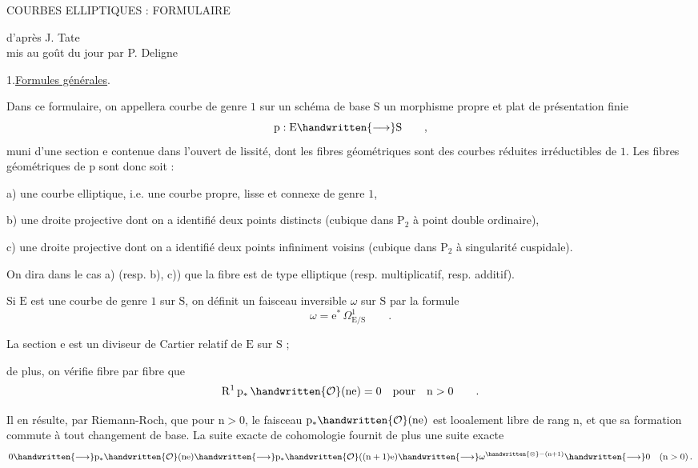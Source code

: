 \begin{center}
COURBES ELLIPTIQUES : FORMULAIRE

d'après J. Tate\\
mis au goût du jour par P. Deligne
\end{center}

1.\qquad \uline{Formules générales}.

Dans ce formulaire, on appellera courbe de genre $1$ sur un schéma de base $\mathrm{S}$ un morphisme propre et plat de présentation finie
\[
\mathrm{p}:\mathrm{E}\handwritten{\longrightarrow}\mathrm{S}\qquad,
\]
muni d'une section $\mathrm{e}$ contenue dans l'ouvert de lissité, dont les fibres géométriques sont des courbes réduites irréductibles de \reversemarginpar{}\normalmarginpar $1$. Les fibres géométriques de $\mathrm{p}$ sont donc soit :

a) une courbe elliptique, i.e. une courbe propre, lisse et connexe de genre $1$,

b) une droite projective dont on a identifié deux points distincts (cubique dans $\mathrm{P}_{2}$ à point double ordinaire),

c) une droite projective dont on a identifié deux points infiniment voisins (cubique dans $\mathrm{P}_{2}$ à singularité cuspidale).

On dira dans le cas a) (resp. b), c)) que la fibre est de type elliptique (resp. multiplicatif, resp. additif).

Si $\mathrm{E}$ est une courbe de genre $1$ sur $\mathrm{S}$, on définit un faisceau inversible $\omega$ sur $\mathrm{S}$ par la formule
\[
\omega=\mathrm{e}^{*}\,\Omega^{1}_{\mathrm{E}/\mathrm{S}}\qquad.
\]

La section $\mathrm{e}$ est un diviseur de Cartier relatif de $\mathrm{E}$ sur $\mathrm{S}$ ;
\clearpage

\begingroup
\normalmarginpar
de plus, on vérifie fibre par fibre que
\[
\mathrm{R}^{1}\,\mathrm{p}_{*}\,\handwritten{\mathcal{O}}(\mathrm{ne})=0\quad\text{pour}\quad\mathrm{n}>0\qquad.
\]

Il en résulte, par Riemann-Roch, que pour $\mathrm{n}>0$, le faisceau $\mathrm{p}_{*}\handwritten{\mathcal{O}}(\mathrm{ne})$ est looalement libre de rang $\mathrm{n}$, et que sa formation commute à tout changement de base. La suite exacte de cohomologie fournit de plus une suite exacte
\[
0\handwritten{\longrightarrow}\mathrm{p}_{*}\handwritten{\mathcal{O}}(\mathrm{ne})
\handwritten{\longrightarrow}\mathrm{p}_{*}\handwritten{\mathcal{O}}((\mathrm{n}+1)\mathrm{e})
\handwritten{\longrightarrow}\omega^{\handwritten{\otimes}-(\mathrm{n}+1)}
\handwritten{\longrightarrow}0\quad(\mathrm{n}>0)\,.
\]

